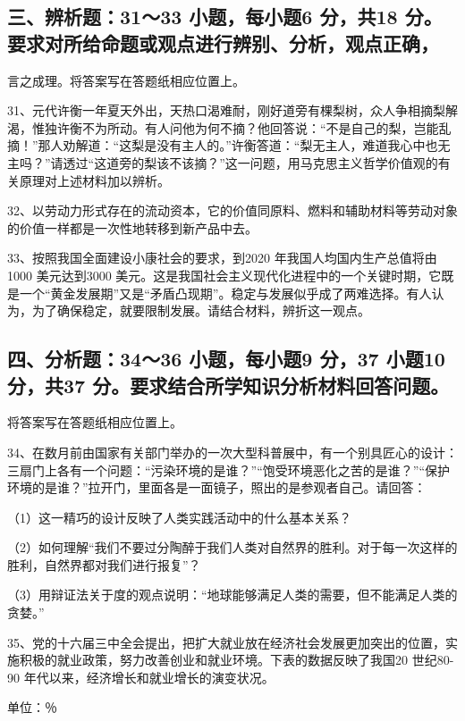 \documentclass[UTF8,11pt]{ctexart}
\begin{document}
\subsection*{三、辨析题：31～33 小题，每小题6 分，共18 分。要求对所给命题或观点进行辨别、分析，观点正确，}

言之成理。将答案写在答题纸相应位置上。


31、元代许衡一年夏天外出，天热口渴难耐，刚好道旁有棵梨树，众人争相摘梨解渴，惟独许衡不为所动。有人问他为何不摘？他回答说：“不是自己的梨，岂能乱摘！”那人劝解道：“这梨是没有主人的。”许衡答道：“梨无主人，难道我心中也无主吗？”请透过“这道旁的梨该不该摘？”这一问题，用马克思主义哲学价值观的有关原理对上述材料加以辨析。


32、以劳动力形式存在的流动资本，它的价值同原料、燃料和辅助材料等劳动对象的价值一样都是一次性地转移到新产品中去。


33、按照我国全面建设小康社会的要求，到2020 年我国人均国内生产总值将由1000 美元达到3000 美元。这是我国社会主义现代化进程中的一个关键时期，它既是一个“黄金发展期”又是“矛盾凸现期”。稳定与发展似乎成了两难选择。有人认为，为了确保稳定，就要限制发展。请结合材料，辨折这一观点。


\subsection*{四、分析题：34～36 小题，每小题9 分，37 小题10 分，共37 分。要求结合所学知识分析材料回答问题。}

将答案写在答题纸相应位置上。


34、在数月前由国家有关部门举办的一次大型科普展中，有一个别具匠心的设计：三扇门上各有一个问题：“污染环境的是谁？”“饱受环境恶化之苦的是谁？”“保护环境的是谁？”拉开门，里面各是一面镜子，照出的是参观者自己。请回答：


（1）这一精巧的设计反映了人类实践活动中的什么基本关系？


（2）如何理解“我们不要过分陶醉于我们人类对自然界的胜利。对于每一次这样的胜利，自然界都对我们进行报复”？


（3）用辩证法关于度的观点说明：“地球能够满足人类的需要，但不能满足人类的贪婪。”


35、党的十六届三中全会提出，把扩大就业放在经济社会发展更加突出的位置，实施积极的就业政策，努力改善创业和就业环境。下表的数据反映了我国20 世纪80-90 年代以来，经济增长和就业增长的演变状况。


单位：％
\end{document}
